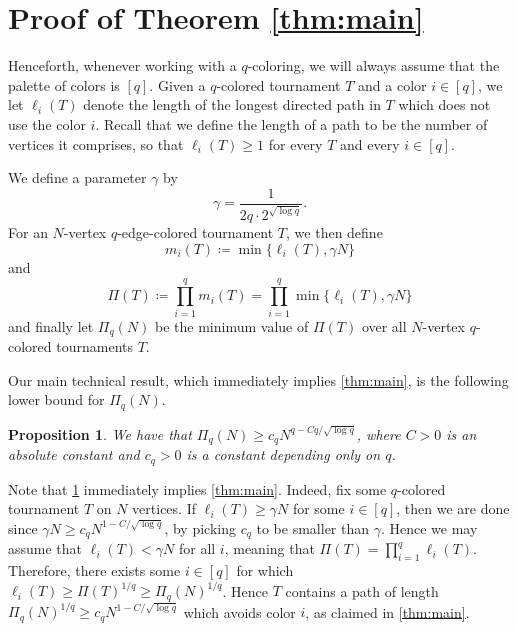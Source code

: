 \documentclass[11pt,reqno]{amsart}
\newtheorem{proposition}[theorem]{Proposition}
\theoremstyle{definition}
\newcommand\1{\mathbf{1}}
\let\geq\geqslant
\begin{document}
\section{Proof of Theorem \ref{thm:main}}\label{sec:main proof}

Henceforth, whenever working with a $q$-coloring, we will always assume that the palette of colors is $[q]$. Given a $q$-colored tournament $T$ and a color $i \in [q]$, we let $\ell_i(T)$ denote the length of the longest directed path in $T$ which does not use the color $i$. Recall that we define the length of a path to be the number of vertices it comprises, so that $\ell_i(T)\geq 1$ for every $T$ and every $i \in [q]$. 

We define a parameter $\gamma$ by
\begin{equation}\label{eq:gamma def}
    \gamma = \frac{1}{2q\cdot 2^{\sqrt{\log q}}}.
\end{equation}
For an $N$-vertex $q$-edge-colored tournament $T$, we then define
\[
    m_i(T) \coloneqq \min\{\ell_i(T), \gamma N\}
\]
and 
\[
    \Pi(T) \coloneqq \prod_{i=1}^q m_i(T)= \prod_{i=1}^q \min\{\ell_i(T),\gamma N\}
\]
and finally let $\Pi_q(N)$ be the minimum value of $\Pi(T)$ over all $N$-vertex $q$-colored tournaments $T$. 

Our main technical result, which immediately implies \cref{thm:main}, is the following lower bound for $\Pi_q(N)$.
\begin{proposition}\label{prop:T main product}
    We have that $\Pi_q(N) \geq c_q N^{q-Cq/\sqrt{\log q}}$, where $C>0$ is an absolute constant and $c_q>0$ is a constant depending only on $q$.
\end{proposition}
Note that \cref{prop:T main product} immediately implies \cref{thm:main}. Indeed, fix some $q$-colored tournament $T$ on $N$ vertices. If $\ell_i(T)\geq \gamma N$ for some $i\in [q]$, then we are done since $\gamma N \geq c_q N^{1-C/\sqrt{\log q}}$, by picking $c_q$ to be smaller than $\gamma$. Hence we may assume that $\ell_i(T)<\gamma N$ for all $i$, meaning that $\Pi(T)=\prod_{i=1}^q \ell_i(T)$. Therefore, there exists some $i \in [q]$ for which $\ell_i(T) \geq \Pi(T)^{1/q} \geq \Pi_q(N)^{1/q}$. Hence $T$ contains a path of length $\Pi_q(N)^{1/q} \geq c_q N^{1-C/\sqrt{\log q}}$ which avoids color $i$, as claimed in \cref{thm:main}. 
\end{document}
